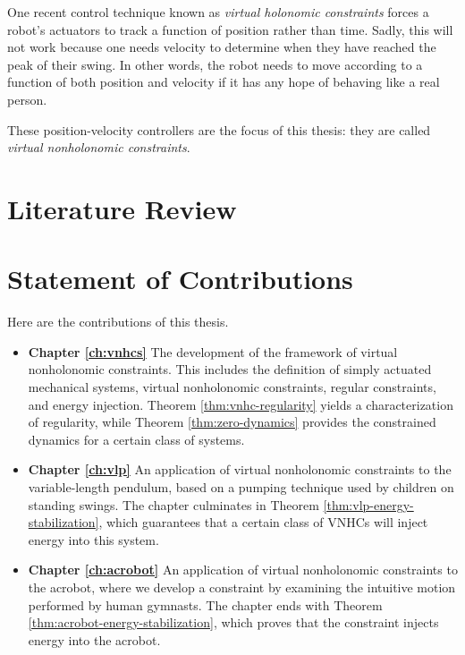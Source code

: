 One recent control technique known as \textit{virtual holonomic constraints}
forces a robot's actuators to track a function of position rather than time.
Sadly, this will not work because one needs velocity to determine when
they have reached the peak of their swing.
In other words, the robot needs to move according to a function of both position
and velocity if it has any hope of behaving like a real person.

These position-velocity controllers are the focus of this thesis: they are called
\textit{virtual nonholonomic constraints}.

\section{Literature Review}


\section{Statement of Contributions}
Here are the contributions of this thesis.
\begin{itemize}[label={}]
   \item \textbf{Chapter \ref{ch:vnhcs}} The development of the framework of
      virtual nonholonomic constraints.
      This includes the definition of simply actuated mechanical systems, virtual
      nonholonomic constraints, regular constraints, and energy injection.
      Theorem \ref{thm:vnhc-regularity} yields a characterization of regularity, 
      while Theorem \ref{thm:zero-dynamics} provides the constrained dynamics
      for a certain class of systems.
   \item \textbf{Chapter \ref{ch:vlp}} An application of virtual nonholonomic
      constraints to the variable-length pendulum, based on a pumping technique
      used by children on standing swings.
      The chapter culminates in Theorem \ref{thm:vlp-energy-stabilization},
      which guarantees that a certain class of VNHCs will inject energy into
      this system.
   \item \textbf{Chapter \ref{ch:acrobot}} An application of virtual
      nonholonomic constraints to the acrobot, where we develop a constraint
      by examining the intuitive motion performed by human gymnasts.
      The chapter ends with Theorem \ref{thm:acrobot-energy-stabilization},
      which proves that the constraint injects energy into the acrobot.
\end{itemize}

